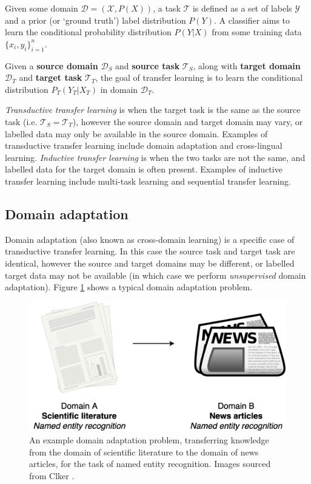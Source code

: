 Given some domain $ \mathcal{D} = (\mathcal{X}, P(X)) $, a task $ \mathcal{T} $ is defined as a set of labels $ \mathcal{Y} $ and a prior (or `ground truth') label distribution $ P(Y) $. A classifier aims to learn the conditional probability distribution $ P(Y | X) $ from some training data $ \{x_i, y_i\}_{i=1}^{n} $.

Given a \textbf{source domain} $ \mathcal{D}_S $ and \textbf{source task} $ \mathcal{T}_S $, along with \textbf{target domain} $ \mathcal{D}_T $ and \textbf{target task} $ \mathcal{T}_T $, the goal of transfer learning is to learn the conditional distribution $ P_T (Y_T | X_T) $ in domain $ \mathcal{D}_T $.

\textit{Transductive transfer learning} is when the target task is the same as the source task (i.e. $ \mathcal{T}_S = \mathcal{T}_T $), however the source domain and target domain may vary, or labelled data may only be available in the source domain. Examples of transductive transfer learning include domain adaptation and cross-lingual learning. \textit{Inductive transfer learning} is when the two tasks are not the same, and labelled data for the target domain is often present. Examples of inductive transfer learning include multi-task learning and sequential transfer learning. 

\subsection{Domain adaptation} \label{subsec:domain-adaptation}

Domain adaptation (also known as cross-domain learning) is a specific case of transductive transfer learning. In this case the source task and target task are identical, however the source and target domains may be different, or labelled target data may not be available (in which case we perform \textit{unsupervised} domain adaptation). Figure \ref{fig:domain-adaptation} shows a typical domain adaptation problem.

\begin{figure}[ht]
    \centering
    \includegraphics[scale=0.24]{0-img/domain-adaptation.png}
    \caption{An example domain adaptation problem, transferring knowledge from the domain of scientific literature to the domain of news articles, for the task of named entity recognition. Images sourced from Clker \cite{clker}.}
    \label{fig:domain-adaptation}
\end{figure}

